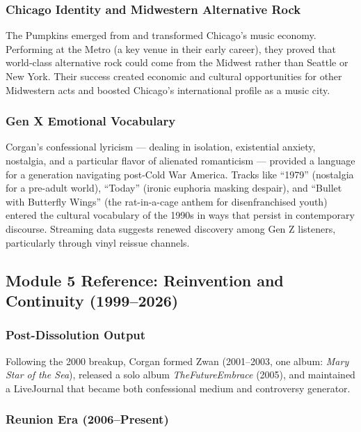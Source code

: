 \documentclass[11pt,letterpaper]{article}
\begin{document}
\subsubsection{Chicago Identity and Midwestern Alternative Rock}

The Pumpkins emerged from and transformed Chicago's music economy. Performing at the Metro (a key venue in their early career), they proved that world-class alternative rock could come from the Midwest rather than Seattle or New York. Their success created economic and cultural opportunities for other Midwestern acts and boosted Chicago's international profile as a music city.

\subsubsection{Gen X Emotional Vocabulary}

Corgan's confessional lyricism --- dealing in isolation, existential anxiety, nostalgia, and a particular flavor of alienated romanticism --- provided a language for a generation navigating post-Cold War America. Tracks like ``1979'' (nostalgia for a pre-adult world), ``Today'' (ironic euphoria masking despair), and ``Bullet with Butterfly Wings'' (the rat-in-a-cage anthem for disenfranchised youth) entered the cultural vocabulary of the 1990s in ways that persist in contemporary discourse. Streaming data suggests renewed discovery among Gen Z listeners, particularly through vinyl reissue channels.

\subsection{Module 5 Reference: Reinvention and Continuity (1999--2026)}

\subsubsection{Post-Dissolution Output}

Following the 2000 breakup, Corgan formed Zwan (2001--2003, one album: \textit{Mary Star of the Sea}), released a solo album \textit{TheFutureEmbrace} (2005), and maintained a LiveJournal that became both confessional medium and controversy generator.

\subsubsection{Reunion Era (2006--Present)}
\end{document}
